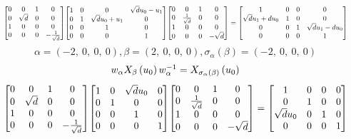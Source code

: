 \documentclass[11pt]{article}
\theoremstyle{definition}
\begin{document}
\[
\scaletoalign{\textwidth}{{\left[\begin{matrix}0 & 0 & 1 & 0\\0 & \sqrt{d} & 0 & 0\\1 & 0 & 0 & 0\\0 & 0 & 0 & - \frac{1}{\sqrt{d}}\end{matrix}\right]} {\left[\begin{matrix}1 & 0 & 0 & \sqrt{d} u_{0} - u_{1}\\0 & 1 & \sqrt{d} u_{0} + u_{1} & 0\\0 & 0 & 1 & 0\\0 & 0 & 0 & 1\end{matrix}\right]} {\left[\begin{matrix}0 & 0 & 1 & 0\\0 & \frac{1}{\sqrt{d}} & 0 & 0\\1 & 0 & 0 & 0\\0 & 0 & 0 & - \sqrt{d}\end{matrix}\right]} = {\left[\begin{matrix}1 & 0 & 0 & 0\\\sqrt{d} u_{1} + d u_{0} & 1 & 0 & 0\\0 & 0 & 1 & \sqrt{d} u_{1} - d u_{0}\\0 & 0 & 0 & 1\end{matrix}\right]}}
\]
\[
\alpha = \left( -2, \  0, \  0, \  0\right), \beta = \left( 2, \  0, \  0, \  0\right), \sigma_{\alpha}(\beta) = \left( -2, \  0, \  0, \  0\right)
\]
\[
\scaletoalign{\textwidth}{w_{\alpha} X_{\beta}\left(u_{0}\right) w_{\alpha}^{-1} = X_{\sigma_{\alpha}\left(\beta\right)}\left(u_{0}\right)}
\]
\[
\scaletoalign{\textwidth}{{\left[\begin{matrix}0 & 0 & 1 & 0\\0 & \sqrt{d} & 0 & 0\\1 & 0 & 0 & 0\\0 & 0 & 0 & - \frac{1}{\sqrt{d}}\end{matrix}\right]} {\left[\begin{matrix}1 & 0 & \sqrt{d} u_{0} & 0\\0 & 1 & 0 & 0\\0 & 0 & 1 & 0\\0 & 0 & 0 & 1\end{matrix}\right]} {\left[\begin{matrix}0 & 0 & 1 & 0\\0 & \frac{1}{\sqrt{d}} & 0 & 0\\1 & 0 & 0 & 0\\0 & 0 & 0 & - \sqrt{d}\end{matrix}\right]} = {\left[\begin{matrix}1 & 0 & 0 & 0\\0 & 1 & 0 & 0\\\sqrt{d} u_{0} & 0 & 1 & 0\\0 & 0 & 0 & 1\end{matrix}\right]}}
\]
\end{document}
